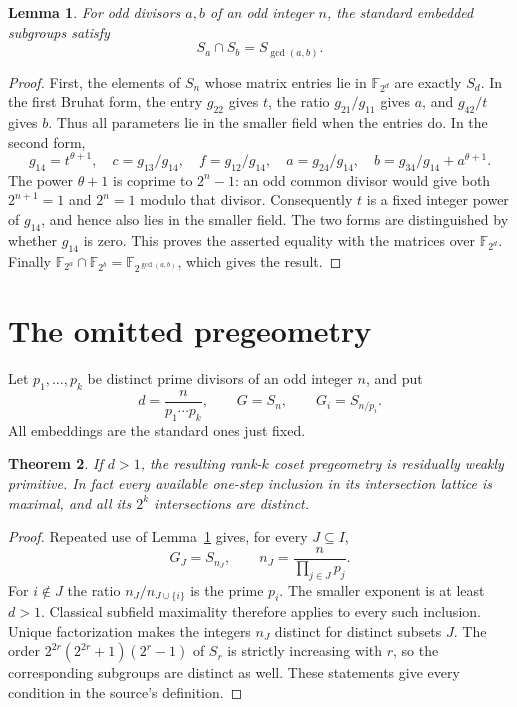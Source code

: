 \documentclass[11pt,a4paper]{article}
\newtheorem{theorem}{Theorem}
\newtheorem{lemma}[theorem]{Lemma}
\newcommand{\F}{\mathbb F}
\begin{document}
\begin{lemma}\label{intersection}
For odd divisors $a,b$ of an odd integer $n$, the standard embedded
subgroups satisfy
\[
                       S_a\cap S_b=S_{\gcd(a,b)}.
\]
\end{lemma}
\begin{proof}
First, the elements of $S_n$ whose matrix entries lie in $\F_{2^d}$
are exactly $S_d$. In the first Bruhat form, the entry $g_{22}$ gives
$t$, the ratio $g_{21}/g_{11}$ gives $a$, and $g_{42}/t$ gives $b$.
Thus all parameters lie in the smaller field when the entries do.
In the second form,
\[
 g_{14}=t^{\theta+1},\quad c=g_{13}/g_{14},\quad
 f=g_{12}/g_{14},\quad a=g_{24}/g_{14},\quad
 b=g_{34}/g_{14}+a^{\theta+1}.
\]
The power $\theta+1$ is coprime to $2^n-1$: an odd common divisor
would give both $2^{n+1}=1$ and $2^n=1$ modulo that divisor.
Consequently $t$ is a fixed integer power of $g_{14}$, and hence also
lies in the smaller field. The two forms are distinguished by whether
$g_{14}$ is zero. This proves the asserted equality with the matrices
over $\F_{2^d}$. Finally
$\F_{2^a}\cap\F_{2^b}=\F_{2^{\gcd(a,b)}}$, which gives the result.
\end{proof}

\section{The omitted pregeometry}
Let $p_1,\ldots,p_k$ be distinct prime divisors of an odd integer $n$,
and put
\[
 d=\frac{n}{p_1\cdots p_k},\qquad G=S_n,\qquad G_i=S_{n/p_i}.
\]
All embeddings are the standard ones just fixed.

\begin{theorem}\label{family}
If $d>1$, the resulting rank-$k$ coset pregeometry is residually
weakly primitive. In fact every available one-step inclusion in its
intersection lattice is maximal, and all its $2^k$ intersections are
distinct.
\end{theorem}
\begin{proof}
Repeated use of Lemma~\ref{intersection} gives, for every $J\subseteq I$,
\[
                G_J=S_{n_J},\qquad n_J=\frac{n}{\prod_{j\in J}p_j}.
\]
For $i\notin J$ the ratio $n_J/n_{J\cup\{i\}}$ is the prime $p_i$.
The smaller exponent is at least $d>1$. Classical subfield maximality
therefore applies to every such inclusion. Unique factorization makes
the integers $n_J$ distinct for distinct subsets $J$. The order
$2^{2r}(2^{2r}+1)(2^r-1)$ of $S_r$ is strictly increasing with $r$,
so the corresponding subgroups are distinct as well. These statements
give every condition in the source's definition.
\end{proof}
\end{document}
